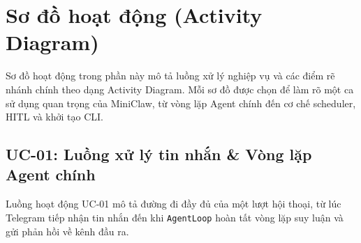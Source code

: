 \section{Sơ đồ hoạt động (Activity Diagram)}
Sơ đồ hoạt động trong phần này mô tả luồng xử lý nghiệp vụ và các điểm rẽ nhánh chính theo dạng Activity Diagram. Mỗi sơ đồ được chọn để làm rõ một ca sử dụng quan trọng của MiniClaw, từ vòng lặp Agent chính đến cơ chế scheduler, HITL và khởi tạo CLI.

\subsection{UC-01: Luồng xử lý tin nhắn \& Vòng lặp Agent chính}
Luồng hoạt động UC-01 mô tả đường đi đầy đủ của một lượt hội thoại, từ lúc Telegram tiếp nhận tin nhắn đến khi \texttt{AgentLoop} hoàn tất vòng lặp suy luận và gửi phản hồi về kênh đầu ra.


